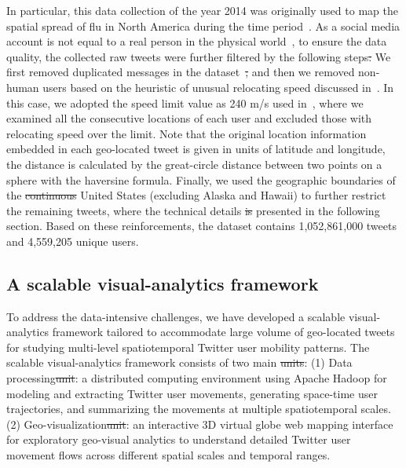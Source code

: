 \documentclass[ijgi,article,accept,moreauthors,pdftex,10pt,a4paper]{mdpi}
\theoremstyle{mdpi}
\newcounter{ex}
\newcounter{re}
\theoremstyle{mdpidefinition}
\providecommand{\DIFadd}[1]{{\protect\color{blue}\uwave{#1}}} %
\providecommand{\DIFdel}[1]{{\protect\color{red}\sout{#1}}}                      %
\providecommand{\DIFaddbegin}{} %
\providecommand{\DIFaddend}{} %
\providecommand{\DIFdelbegin}{} %
\providecommand{\DIFdelend}{} %
\begin{document}
In particular, this data collection of the year 2014 was originally used to map the spatial spread of flu in North America during the time period~\cite{padmanabhan2014flumapper}.
As a social media account is not equal to a real person in the physical world~\cite{tsou2015}, to ensure the data quality, the collected raw tweets were further filtered by the following steps\DIFdelbegin \DIFdel{: }\DIFdelend \DIFaddbegin \DIFadd{.
}\DIFaddend We first removed duplicated messages in the dataset~\cite{black2012twitter}\DIFdelbegin \DIFdel{; }\DIFdelend \DIFaddbegin \DIFadd{, }\DIFaddend and then we removed non-human users based on the heuristic of unusual relocating speed discussed in~\cite{hawelka2014geo,Jurdak2015}.
In this case, we adopted the speed limit value as 240 m/s used in~\cite{Jurdak2015}, where we examined all the consecutive locations of each user and excluded those with relocating speed over the limit.
Note that the original location information embedded in each geo-located tweet is given in units of latitude and longitude, the distance is calculated by the great-circle distance between two points on a sphere with the haversine formula.
Finally, we used the geographic boundaries of the \DIFdelbegin \DIFdel{continuous }\DIFdelend \DIFaddbegin \DIFadd{conterminous }\DIFaddend United States (excluding Alaska and Hawaii) to further restrict the remaining tweets, where the technical details \DIFdelbegin \DIFdel{is }\DIFdelend \DIFaddbegin \DIFadd{are }\DIFaddend presented in the following section. Based on these reinforcements, the dataset contains 1,052,861,000 tweets and 4,559,205 unique users.

\subsection{A scalable visual-analytics framework}
To address the data-intensive challenges, we have developed a scalable visual-analytics framework tailored to accommodate large volume of geo-located tweets for studying multi-level spatiotemporal Twitter user mobility patterns.
The scalable visual-analytics framework consists of two main \DIFdelbegin \DIFdel{units}\DIFdelend \DIFaddbegin \DIFadd{components}\DIFaddend : (1) Data processing\DIFdelbegin \DIFdel{unit}\DIFdelend : a distributed computing environment using Apache Hadoop for modeling and extracting Twitter user movements, generating space-time user trajectories, and summarizing the movements at multiple spatiotemporal scales.
(2) Geo-visualization\DIFdelbegin \DIFdel{unit}\DIFdelend : an interactive 3D virtual globe web mapping interface for exploratory geo-visual analytics to understand detailed Twitter user movement flows across different spatial scales and temporal ranges. 
\end{document}
